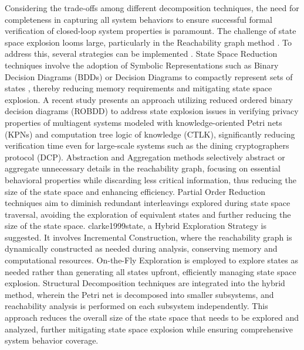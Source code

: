 \documentclass{ieeeojies}
\begin{document}
Considering the trade-offs among different decomposition techniques, the need for completeness in capturing all system behaviors to ensure successful formal verification of closed-loop system properties is paramount. The challenge of state space explosion looms large, particularly in the Reachability graph method \cite{zambon2012graph, apel2016fly}. To address this, several strategies can be implemented \cite{xin2009methods}. State Space Reduction techniques involve the adoption of Symbolic Representations such as Binary Decision Diagrams (BDDs)  or Decision Diagrams to compactly represent sets of states \cite{shrestha2009decision}, thereby reducing memory requirements and mitigating state space explosion. A recent study \cite{he2022petri} presents an approach utilizing reduced ordered binary decision diagrams (ROBDD) to address state explosion issues in verifying privacy properties of multiagent systems modeled with knowledge-oriented Petri nets (KPNs) and computation tree logic of knowledge (CTLK), significantly reducing verification time even for large-scale systems such as the dining cryptographers protocol (DCP). Abstraction and Aggregation methods \cite{ludtke2018state} selectively abstract or aggregate unnecessary details in the reachability graph, focusing on essential behavioral properties while discarding less critical information, thus reducing the size of the state space and enhancing efficiency. Partial Order Reduction techniques \cite{godefroid1996partial, clarke1999state} aim to diminish redundant interleavings explored during state space traversal, avoiding the exploration of equivalent states and further reducing the size of the state space. clarke1999state,  a Hybrid Exploration Strategy is suggested. It involves Incremental Construction, where the reachability graph is dynamically constructed as needed during analysis, conserving memory and computational resources. On-the-Fly Exploration is employed to explore states as needed rather than generating all states upfront, efficiently managing state space explosion. Structural Decomposition techniques are integrated into the hybrid method, wherein the Petri net is decomposed into smaller subsystems, and reachability analysis is performed on each subsystem independently. This approach reduces the overall size of the state space that needs to be explored and analyzed, further mitigating state space explosion while ensuring comprehensive system behavior coverage.
\end{document}
